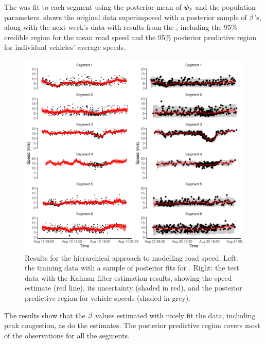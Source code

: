 The \kf{} was fit to each segment using the posterior mean of $\mathbf{\boldsymbol{\psi}}_\ell$ and the population parameters.  shows the original data superimposed with a posterior sample of $\beta$'s, along with the next week's data with results from the \kf{}, including the 95\% credible region for the mean road speed and the 95\% posterior predictive region for individual vehicles' average speeds.







\begin{knitrout}\small
{}\color{fgcolor}\begin{figure}
\includegraphics[width=\textwidth]{figure/nw_model_n2_kf-1} \caption[Results for the hierarchical approach to modelling road speed]{Results for the hierarchical approach to modelling road speed. Left: the training data with a sample of posterior fits for . Right: the test data with the Kalman filter estimation results, showing the speed estimate (red line), its uncertainty (shaded in red), and the posterior predictive region for vehicle speeds (shaded in grey).}\label{fig:nw_model_n2_kf}
\end{figure}


\end{knitrout}

The results show that the $\beta$ values estimated with  nicely fit the data, including peak congestion, as do the \kf{} estimates. The posterior predictive region covers most of the observations for all the segments.
